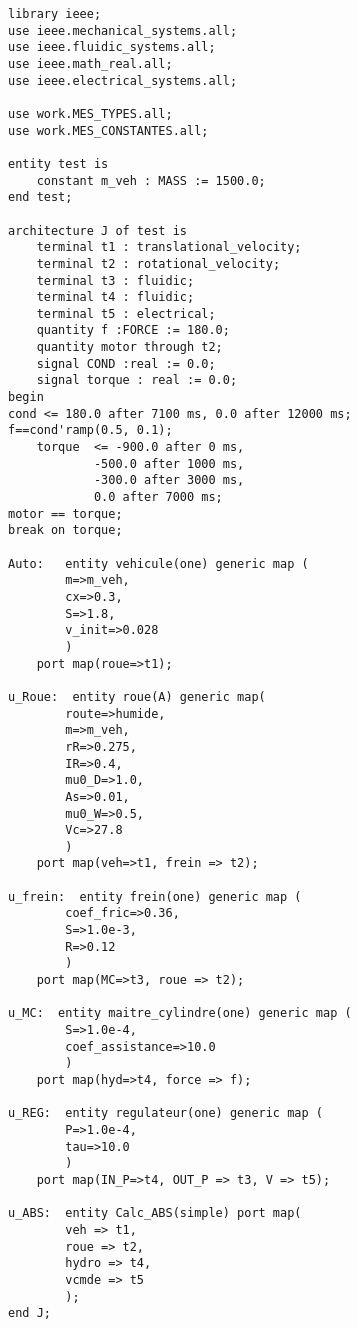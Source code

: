 \begin{verbatim}
library ieee;
use ieee.mechanical_systems.all;
use ieee.fluidic_systems.all;
use ieee.math_real.all;
use ieee.electrical_systems.all;

use work.MES_TYPES.all;
use work.MES_CONSTANTES.all;

entity test is
    constant m_veh : MASS := 1500.0;
end test;

architecture J of test is 
    terminal t1 : translational_velocity;
    terminal t2 : rotational_velocity;
    terminal t3 : fluidic;
    terminal t4 : fluidic; 
    terminal t5 : electrical; 
    quantity f :FORCE := 180.0;
    quantity motor through t2;
    signal COND :real := 0.0;
    signal torque : real := 0.0; 
begin 
cond <= 180.0 after 7100 ms, 0.0 after 12000 ms;
f==cond'ramp(0.5, 0.1);
	torque 	<= -900.0 after 0 ms,
			-500.0 after 1000 ms,
			-300.0 after 3000 ms,
			0.0 after 7000 ms;
motor == torque; 
break on torque; 

Auto: 	entity vehicule(one) generic map (
        m=>m_veh,
        cx=>0.3,
        S=>1.8,
        v_init=>0.028
        ) 
    port map(roue=>t1);

u_Roue:  entity roue(A) generic map(
        route=>humide,
        m=>m_veh,
        rR=>0.275,
        IR=>0.4,
        mu0_D=>1.0,
        As=>0.01,
        mu0_W=>0.5,
        Vc=>27.8
        )
    port map(veh=>t1, frein => t2);

u_frein:  entity frein(one) generic map (
        coef_fric=>0.36,
        S=>1.0e-3,
        R=>0.12
        )
    port map(MC=>t3, roue => t2);

u_MC:  entity maitre_cylindre(one) generic map (
        S=>1.0e-4,
        coef_assistance=>10.0
        )
    port map(hyd=>t4, force => f);

u_REG:  entity regulateur(one) generic map (
        P=>1.0e-4,
        tau=>10.0
        )
    port map(IN_P=>t4, OUT_P => t3, V => t5);

u_ABS:  entity Calc_ABS(simple) port map(
        veh => t1,
        roue => t2,
        hydro => t4,
        vcmde => t5
        );
end J; 
\end{verbatim}